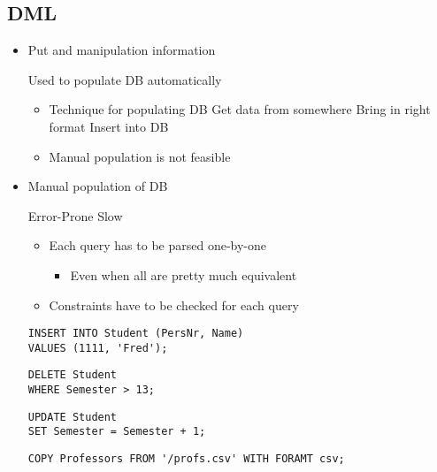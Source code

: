 \subsection{DML}
\begin{itemize}
    \item
        Put and manipulation information

     Used to populate DB automatically
        \begin{itemize}
            \item Technique for populating DB
             Get data from somewhere
             Bring in right format
             Insert into DB
            \item Manual population is not feasible
        \end{itemize}
    \item Manual population of DB
        \begin{itemize}
            \icon Error-Prone
            \icon Slow
                \begin{itemize}
                    \item Each query has to be parsed one-by-one
                        \begin{itemize}
                            \item Even when all are pretty much equivalent
                        \end{itemize}
                    \item Constraints have to be checked for each query
                \end{itemize}
        \end{itemize}
\begin{verbatim}
INSERT INTO Student (PersNr, Name)
VALUES (1111, 'Fred');
\end{verbatim}

\begin{verbatim}
DELETE Student
WHERE Semester > 13;
\end{verbatim}

\begin{verbatim}
UPDATE Student
SET Semester = Semester + 1;
\end{verbatim}

\begin{verbatim}
COPY Professors FROM '/profs.csv' WITH FORAMT csv;
\end{verbatim}
\end{itemize}

